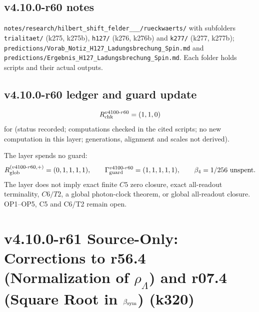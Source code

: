 \subsection*{v4.10.0-r60 notes}
\label{subsec:v4100-r60-notes}

{\raggedright
\texttt{notes/\allowbreak research/\allowbreak hilbert\_\allowbreak shift\_\allowbreak felder\_\_\_/\allowbreak rueckwaerts/} with subfolders
\texttt{trialitaet/} (k275, k275b), \texttt{h127/} (k276, k276b) and \texttt{k277/} (k277, k277b);
\texttt{predictions/\allowbreak Vorab\_\allowbreak Notiz\_\allowbreak H127\_\allowbreak Ladungsbrechung\_\allowbreak Spin.md} and
\texttt{predictions/\allowbreak Ergebnis\_\allowbreak H127\_\allowbreak Ladungsbrechung\_\allowbreak Spin.md}.  Each folder holds scripts and their actual outputs.
\par}

\subsection*{v4.10.0-r60 ledger and guard update}
\label{subsec:v4100-r60-ledger-guard}

\[
R_{\rm chk}^{v4100\text{-}r60}=(1,1,0)
\]
for (status recorded; computations checked in the cited scripts; no new computation in this layer; generations, alignment and scales not derived).

The layer spends no guard:
\[
R_{\rm glob}^{(v4100\text{-}r60,+)}=(0,1,1,1,1),
\qquad
\Gamma_{\rm guard}^{v4100\text{-}r60}=(1,1,1,1,1),
\qquad
\beta_4=1/256\ \text{unspent}.
\]
The layer does not imply exact finite \(C5\) zero closure, exact all-readout terminality, \(C6/T2\), a global photon-clock theorem,
or global all-readout closure.  OP1--OP5, C5 and C6/T2 remain open.

\clearpage
\section*{v4.10.0-r61 Source-Only: Corrections to r56.4 (Normalization of \texorpdfstring{\(\rho_\Lambda\)}{rho Lambda}) and r07.4 (Square Root in \texorpdfstring{\(\beta_{\rm sym}\)}{beta sym}) (k320)}
\label{sec:v4100-r61-corrections}

